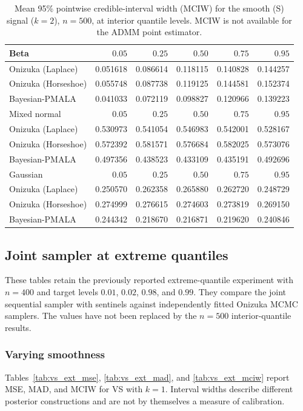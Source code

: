 \begin{table}[!htbp]
\centering
\small
\caption{Mean 95\% pointwise credible-interval width (MCIW) for the smooth (S) signal ($k=2$), $n=500$, at interior quantile levels. MCIW is not available for the ADMM point estimator.}
\label{tab:s_int_mciw}
\begin{tabular}{lrrrrr}
\toprule
Beta & $0.05$ & $0.25$ & $0.50$ & $0.75$ & $0.95$ \\
\midrule
Onizuka (Laplace) & 0.051618 & 0.086614 & 0.118115 & 0.140828 & 0.144257 \\
Onizuka (Horseshoe) & 0.055748 & 0.087738 & 0.119125 & 0.144581 & 0.152374 \\
Bayesian-PMALA & 0.041033 & 0.072119 & 0.098827 & 0.120966 & 0.139223 \\
\midrule
Mixed normal & $0.05$ & $0.25$ & $0.50$ & $0.75$ & $0.95$ \\
\midrule
Onizuka (Laplace) & 0.530973 & 0.541054 & 0.546983 & 0.542001 & 0.528167 \\
Onizuka (Horseshoe) & 0.572392 & 0.581571 & 0.576684 & 0.582025 & 0.573076 \\
Bayesian-PMALA & 0.497356 & 0.438523 & 0.433109 & 0.435191 & 0.492696 \\
\midrule
Gaussian & $0.05$ & $0.25$ & $0.50$ & $0.75$ & $0.95$ \\
\midrule
Onizuka (Laplace) & 0.250570 & 0.262358 & 0.265880 & 0.262720 & 0.248729 \\
Onizuka (Horseshoe) & 0.274999 & 0.276615 & 0.274603 & 0.273819 & 0.269150 \\
Bayesian-PMALA & 0.244342 & 0.218670 & 0.216871 & 0.219620 & 0.240846 \\
\bottomrule
\end{tabular}
\end{table}

\clearpage
\subsection{Joint sampler at extreme quantiles}
\label{app:sim:joint}

These tables retain the previously reported extreme-quantile experiment with $n=400$ and target levels $0.01$, $0.02$, $0.98$, and $0.99$. They compare the joint sequential sampler with sentinels against independently fitted Onizuka MCMC samplers. The values have not been replaced by the $n=500$ interior-quantile results.

\subsubsection{Varying smoothness}
Tables~\ref{tab:vs_ext_mse}, \ref{tab:vs_ext_mad}, and \ref{tab:vs_ext_mciw} report MSE, MAD, and MCIW for VS with $k=1$. Interval widths describe different posterior constructions and are not by themselves a measure of calibration.

